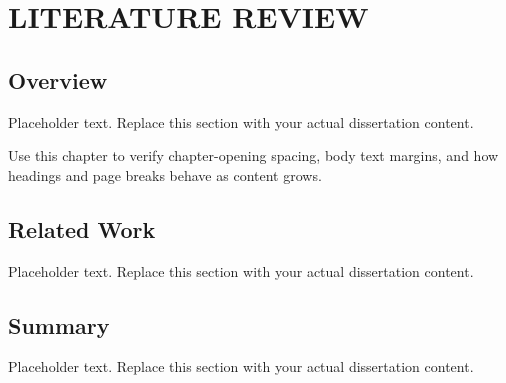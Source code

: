 
\chapter{LITERATURE REVIEW}

\section{Overview}
Placeholder text. Replace this section with your actual dissertation content.

Use this chapter to verify chapter-opening spacing, body text margins, and how headings
and page breaks behave as content grows.

\section{Related Work}
Placeholder text. Replace this section with your actual dissertation content.

\section{Summary}
Placeholder text. Replace this section with your actual dissertation content.
